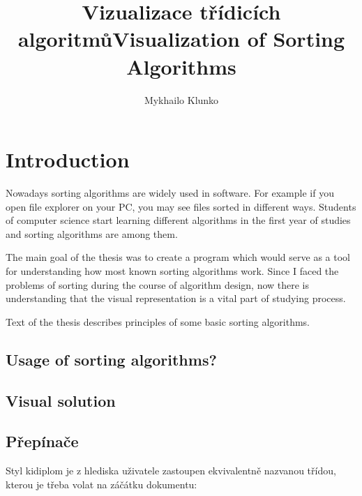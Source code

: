 \documentclass[
  field=inf,
  biblatex,
  language=english,
  glossaries,
  index
]{kidiplom}
\title[czech]{Vizualizace třídicích algoritmů}
\title[english]{Visualization of Sorting Algorithms}
\author{Mykhailo Klunko}
\begin{document}
\maketitle



\newcommand{\BibLaTeX}{\textsc{Bib}\LaTeX}


\section{Introduction}

Nowadays sorting algorithms are widely used in software. For example if you open file explorer on your PC, you may see files sorted in different ways. Students of computer science start learning different algorithms in the first year of studies and sorting algorithms are among them.

The main goal of the thesis was to create a program which would serve as a tool for understanding how most known sorting algorithms work. Since I faced the problems of sorting during the course of algorithm design, now there is understanding that the visual representation is a vital part of studying process.

Text of the thesis describes principles of some basic sorting algorithms.  



\subsection{Usage of sorting algorithms?}

\subsection{Visual solution}

\subsection{Přepínače}
Styl kidiplom je z hlediska uživatele zastoupen ekvivalentně nazvanou třídou, kterou je třeba volat na záčátku dokumentu:
\end{document}
